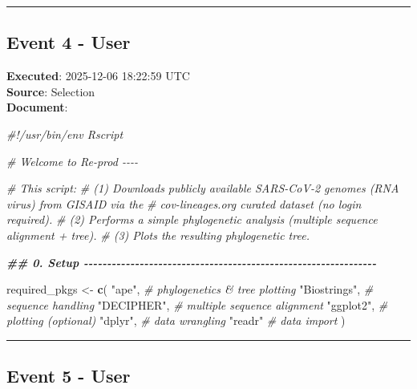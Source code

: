 \documentclass[
  11pt,
]{article}
\newenvironment{Shaded}{\begin{snugshade}}{\end{snugshade}}
\newcommand{\CommentTok}[1]{\textcolor[rgb]{0.56,0.35,0.01}{\textit{#1}}}
\newcommand{\DocumentationTok}[1]{\textcolor[rgb]{0.56,0.35,0.01}{\textbf{\textit{#1}}}}
\newcommand{\FunctionTok}[1]{\textcolor[rgb]{0.13,0.29,0.53}{\textbf{#1}}}
\newcommand{\NormalTok}[1]{#1}
\newcommand{\OtherTok}[1]{\textcolor[rgb]{0.56,0.35,0.01}{#1}}
\newcommand{\StringTok}[1]{\textcolor[rgb]{0.31,0.60,0.02}{#1}}
\begin{document}
\begin{center}\rule{0.5\linewidth}{0.5pt}\end{center}

\subsection{Event 4 - User}\label{event-4---user}

\textbf{Executed}: 2025-12-06 18:22:59 UTC\\
\textbf{Source}: Selection\\
\textbf{Document}:

\begin{Shaded}
\begin{Highlighting}[]
\CommentTok{\#!/usr/bin/env Rscript}

\CommentTok{\# Welcome to Re{-}prod {-}{-}{-}{-}}

\CommentTok{\# This script:}
\CommentTok{\# (1) Downloads publicly available SARS{-}CoV{-}2 genomes (RNA virus) from GISAID via the}
\CommentTok{\#     cov{-}lineages.org curated dataset (no login required).}
\CommentTok{\# (2) Performs a simple phylogenetic analysis (multiple sequence alignment + tree).}
\CommentTok{\# (3) Plots the resulting phylogenetic tree.}

\DocumentationTok{\#\# 0. Setup {-}{-}{-}{-}{-}{-}{-}{-}{-}{-}{-}{-}{-}{-}{-}{-}{-}{-}{-}{-}{-}{-}{-}{-}{-}{-}{-}{-}{-}{-}{-}{-}{-}{-}{-}{-}{-}{-}{-}{-}{-}{-}{-}{-}{-}{-}{-}{-}{-}{-}{-}{-}{-}{-}{-}{-}{-}{-}{-}{-}{-}{-}{-}}

\NormalTok{required\_pkgs }\OtherTok{\textless{}{-}} \FunctionTok{c}\NormalTok{(}
  \StringTok{"ape"}\NormalTok{,          }\CommentTok{\# phylogenetics \& tree plotting}
  \StringTok{"Biostrings"}\NormalTok{,   }\CommentTok{\# sequence handling}
  \StringTok{"DECIPHER"}\NormalTok{,     }\CommentTok{\# multiple sequence alignment}
  \StringTok{"ggplot2"}\NormalTok{,      }\CommentTok{\# plotting (optional)}
  \StringTok{"dplyr"}\NormalTok{,        }\CommentTok{\# data wrangling}
  \StringTok{"readr"}         \CommentTok{\# data import}
\NormalTok{)}
\end{Highlighting}
\end{Shaded}

\begin{center}\rule{0.5\linewidth}{0.5pt}\end{center}

\subsection{Event 5 - User}\label{event-5---user}
\end{document}
